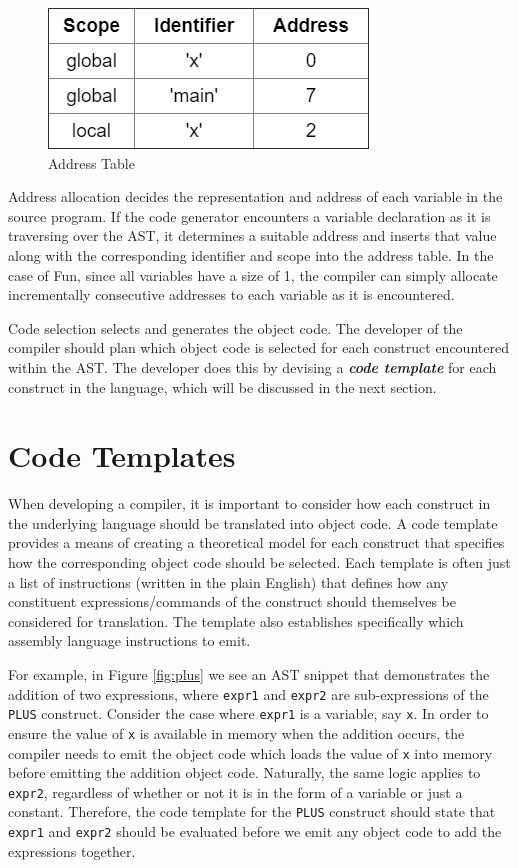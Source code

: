 \documentclass{l4proj}
\begin{document}
\begin{figure}[h]
\centering
\includegraphics[scale=0.5]{images/address-table.png}
\caption{Address Table}
\label{fig:address-table}	
\end{figure}

Address allocation decides the representation and address of each variable in the source program. If the code generator encounters a variable declaration as it is traversing over the AST, it determines a suitable address and inserts that value along with the corresponding identifier and scope into the address table. In the case of Fun, since all variables have a size of 1, the compiler can simply allocate incrementally consecutive addresses to each variable as it is encountered.

Code selection selects and generates the object code. The developer of the compiler should plan which object code is selected for each construct encountered within the AST. The developer does this by devising a \textit{\textbf{code template}} for each construct in the language, which will be discussed in the next section.

\section{Code Templates}
When developing a compiler, it is important to consider how each construct in the underlying language should be translated into object code. A code template provides a means of creating a theoretical model for each construct that specifies how the corresponding object code should be selected. Each template is often just a list of instructions (written in the plain English) that defines how any constituent expressions/commands of the construct should themselves be considered for translation. The template also establishes specifically which assembly language instructions to emit.

For example, in Figure \ref{fig:plus} we see an AST snippet that demonstrates the addition of two expressions, where \texttt{expr1} and \texttt{expr2} are sub-expressions of the \texttt{PLUS} construct. Consider the case where \texttt{expr1} is a variable, say \texttt{x}. In order to ensure the value of \texttt{x} is available in memory when the addition occurs, the compiler needs to emit the object code which loads the value of \texttt{x} into memory before emitting the addition object code. Naturally, the same logic applies to \texttt{expr2}, regardless of whether or not it is in the form of a variable or just a constant. Therefore, the code template for the \texttt{PLUS} construct should state that \texttt{expr1} and \texttt{expr2} should be evaluated before we emit any object code to add the expressions together.
\end{document}
